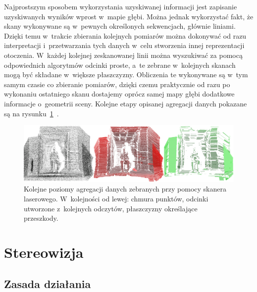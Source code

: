 Najprostszym sposobem wykorzystania uzyskiwanej informacji jest zapisanie
uzyskiwanych wyników wprost w~mapie głębi. Można jednak wykorzystać fakt, że
skany wykonywane są w~pewnych określonych sekwencjach, głównie liniami. Dzięki
temu w~trakcie zbierania kolejnych pomiarów można dokonywać od razu
interpretacji i~przetwarzania tych danych w~celu stworzenia innej reprezentacji
otoczenia. W~każdej kolejnej zeskanowanej linii można wyszukiwać za pomocą
odpowiednich algorytmów odcinki proste, a~te zebrane w~kolejnych skanach mogą
być składane w~większe płaszczyzny. Obliczenia te wykonywane są w~tym samym
czasie co zbieranie pomiarów, dzięki czemu praktycznie od razu po wykonaniu
ostatniego skanu dostajemy oprócz samej mapy głębi dodatkowe informacje
o~geometrii sceny. Kolejne etapy opisanej agregacji danych
pokazane są na rysunku~\ref{fig:laser_aggregate}~\cite{Surmann01a3d}.

\begin{figure}[h!]
\centering
\includegraphics[width=12cm]{../../Common/img/laser_aggregate}
\caption{Kolejne poziomy agregacji danych zebranych przy pomocy skanera
laserowego. W~kolejności od lewej: chmura punktów, odcinki utworzone z~kolejnych
odczytów, płaszczyzny określające przeszkody.}
\label{fig:laser_aggregate}
\end{figure}

\section{Stereowizja}

\subsection{Zasada działania}

